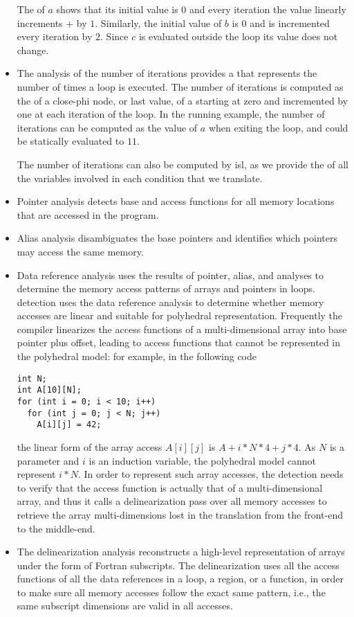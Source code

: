 \documentclass{sig-alternate}
\begin{document}
\begin{itemize}
  The \scev{} of $a$ shows that its initial value is $0$ and every iteration the
  value linearly increments $+$ by $1$.  Similarly, the initial value of $b$ is
  $0$ and is incremented every iteration by $2$.  Since $c$ is evaluated outside
  the loop its value does not change.

\item The analysis of the number of iterations \cite{scev} provides a \scev{}
  that represents the number of times a loop is executed.  The number of
  iterations is computed as the \scev{} of a close-phi node, or last value, of a
  \scev{} starting at zero and incremented by one at each iteration of the loop.
  In the running example, the number of iterations can be computed as the value
  of $a$ when exiting the loop, and could be statically evaluated to $11$.

  The number of iterations can also be computed by isl, as we provide the
   of all the variables involved in each condition that we translate.

\item Pointer analysis detects base and access functions for all memory
  locations that are accessed in the program.

\item Alias analysis disambiguates the base pointers and identifies which
  pointers may access the same memory.

\item Data reference analysis uses the results of pointer, alias, and \scev{}
  analyses to determine the memory access patterns of arrays and pointers in
  loops.  \SCoP{} detection uses the data reference analysis to determine
  whether memory accesses are linear and suitable for polyhedral representation.
  Frequently the compiler linearizes the access functions of a multi-dimensional
  array into base pointer plus offset, leading to access functions that cannot
  be represented in the polyhedral model: for example, in the following code
  \begin{verbatim}
int N;
int A[10][N];
for (int i = 0; i < 10; i++)
  for (int j = 0; j < N; j++)
    A[i][j] = 42;
  \end{verbatim}
  the linear form of the array access $A[i][j]$ is $A + i * N * 4 + j * 4$.  As
  $N$ is a parameter and $i$ is an induction variable, the polyhedral model
  cannot represent $i*N$.  In order to represent such array accesses, the
  \SCoP{} detection needs to verify that the access function is actually that of
  a multi-dimensional array, and thus it calls a delinearization pass over all
  memory accesses to retrieve the array multi-dimensions lost in the translation
  from the front-end to the middle-end.

\item The delinearization analysis \cite{delinearization1, delinearization2}
  reconstructs a high-level representation of arrays under the form of Fortran
  subscripts.  The delinearization uses all the access functions of all the data
  references in a loop, a region, or a function, in order to make sure all
  memory accesses follow the exact same pattern, i.e., the same subscript
  dimensions are valid in all accesses.
\end{itemize}
\end{document}
